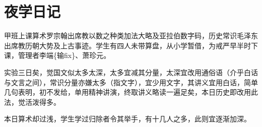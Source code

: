 \section{夜学日记}

甲班上课算术罗宗翰出席教以数之种类加法大略及亚拉伯数字码，历史常识毛泽东出席教历朝大势及上古事迹。学生有四人未带算盘，从小学暂借，为戒严早半时下课，管理者李端\{输fix\}、萧珍元。

实验三日矣，觉国文似太多太深，太多宜减其分量，太深宜改用通俗语（介乎白话与文言之间），常识分量亦嫌太多（指文字），宜少用文字，其讲义宜用白话，简单几句表明，初不发给，单用精神讲演，终取讲义略读一遍足矣，本日历史即改用此法，觉活泼得多。

本日算术却过浅，学生学过归除者令其举手，有十几人之多，此则宜逐渐加深。

